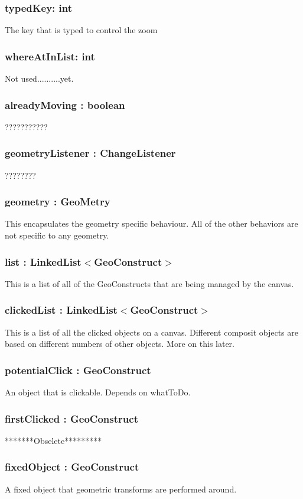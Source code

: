 \documentclass[a4paper,10pt]{report}
\begin{document}
\subsubsection{typedKey: int} The key that is typed to control the zoom
\subsubsection{whereAtInList: int} Not used..........yet.
\subsubsection{alreadyMoving : boolean}???????????
\subsubsection{geometryListener : ChangeListener}????????
\subsubsection{geometry : GeoMetry} This encapsulates the geometry specific behaviour.  All of the other behaviors are not specific to any geometry.
\subsubsection{list : LinkedList$<$GeoConstruct$>$ } This is a list of all of the GeoConstructs that are being managed by the canvas.
\subsubsection{clickedList : LinkedList$<$GeoConstruct$>$ } This is a list of all the clicked objects on a canvas.  Different composit objects are based on different numbers of other objects.  More on this later.
\subsubsection{potentialClick : GeoConstruct}  An object that is clickable.  Depends on whatToDo.
\subsubsection{firstClicked : GeoConstruct} *******Obselete*********
\subsubsection{fixedObject : GeoConstruct} A fixed object that geometric transforms are performed around.
\end{document}
